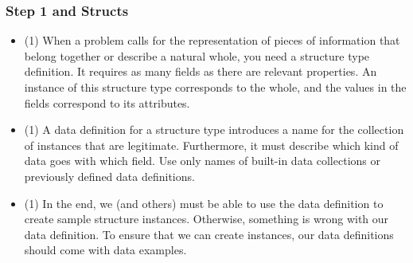 \documentclass{beamer}
\begin{document}
\begin{frame}
  \frametitle{Step 1 and Structs}
  \begin{itemize}
  \item<2-> (1) When a problem calls for the representation of pieces of information that belong together or describe a natural whole, you need a structure type definition. It requires as many fields as there are relevant properties. An instance of this structure type corresponds to the whole, and the values in the fields correspond to its attributes.
  \item<3-> (1) A data definition for a structure type introduces a name for the collection of instances that are legitimate. Furthermore, it must describe which kind of data goes with which field. Use only names of built-in data collections or previously defined data definitions.
  \item<4-> (1) In the end, we (and others) must be able to use the data definition to create sample structure instances. Otherwise, something is wrong with our data definition. To ensure that we can create instances, our data definitions should come with data examples.
  \end{itemize}
\end{frame}




\end{document}
